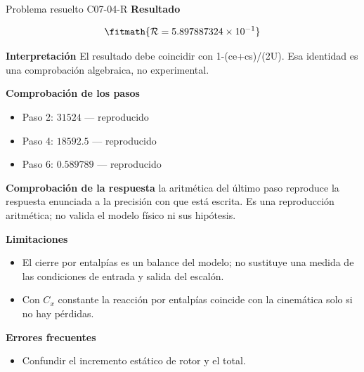 \documentclass[10pt,openany]{book}
\begin{document}
\begin{studiumworked}{Problema resuelto C07-04-R}
\noindent\textbf{Resultado}

\[
\fitmath{\mathcal R=5.897887324\times10^{-1}}
\]

\noindent\textbf{Interpretación}
El resultado debe coincidir con 1-(ce+cs)/(2U). Esa identidad es una comprobación algebraica, no experimental.

\noindent\textbf{Comprobación de los pasos}
\begin{itemize}
\item Paso 2: $31524$ — reproducido
\item Paso 4: $18592.5$ — reproducido
\item Paso 6: $0.589789$ — reproducido
\end{itemize}

\noindent\textbf{Comprobación de la respuesta} la aritmética del último paso reproduce la respuesta enunciada a la precisión con que está escrita. Es una reproducción aritmética; no valida el modelo físico ni sus hipótesis.

\noindent\textbf{Limitaciones}
\begin{itemize}
\item El cierre por entalpías es un balance del modelo; no sustituye una medida de las condiciones de entrada y salida del escalón.
\item Con $C_x$ constante la reacción por entalpías coincide con la cinemática solo si no hay pérdidas.
\end{itemize}

\noindent\textbf{Errores frecuentes}
\begin{itemize}
\item Confundir el incremento estático de rotor y el total.
\end{itemize}
\end{studiumworked}
\end{document}
